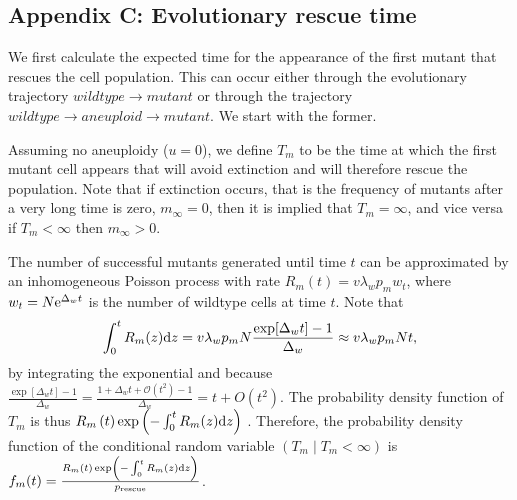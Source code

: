 \documentclass[12pt]{extarticle}
\renewcommand{\d}[1]{\ensuremath{\operatorname{d}\!{#1}}}
\renewcommand{\d}{{\rm d}}
\newcommand{\e}{{\rm e}}
\newcommand{\presc}{p_\text{rescue}}
\begin{document}
\begin{appendices}
\section*{Appendix C: Evolutionary rescue time}

We first calculate the expected time for the appearance of the first mutant that rescues the cell population.
This can occur either through the evolutionary trajectory $wildtype \rightarrow mutant$ or through the trajectory $wildtype \rightarrow aneuploid \rightarrow mutant$.
We start with the former. 

Assuming no aneuploidy ($u=0$), we define $T_m$ to be the time at which the first mutant cell appears that will avoid extinction and will therefore rescue the population.
Note that if extinction occurs, that is the frequency of mutants after a very long time is zero, $m_{\infty}=0$, then it is implied that $T_m=\infty$, and vice versa if $T_m<\infty$ then $m_{\infty}>0$.

The number of successful mutants generated until time $t$ can be approximated by an inhomogeneous Poisson process with rate $R_m\left(t\right) = v\lambda_w p_m w_t$,
where $w_t=N\e^{\Delta_w t}$ is the number of wildtype cells at time $t$.
Note that 
\begin{equation}\label{eq:integralR}
\int_0^{t}{R_m(z)\d z} = 
v\lambda_w p_m N \frac{\exp[{\Delta_w t}]-1}{\Delta_w} \approx 
v\lambda_w p_m N t,
\end{equation}
by integrating the exponential and because $\frac{\exp[\Delta_w t]-1}{\Delta_w}=\frac{1+\Delta_w t+\mathcal{O}(t^2)-1}{\Delta_w}=t+O(t^2)$.
The probability density function of $T_m$ is thus
$R_m\left(t\right)\exp\left(-\int_0^{t}{R_m(z)\d z}\right)$ \citep{allen2010introduction}. 
Therefore, the probability density function of the conditional random variable $(T_m \mid T_m < \infty)$ is
$f_m(t) = \frac{R_m\left(t\right)\exp\left(-\int_0^{t}{R_m(z)\d z}\right)}{\presc}$. 
\\


\end{appendices}
\end{document}
